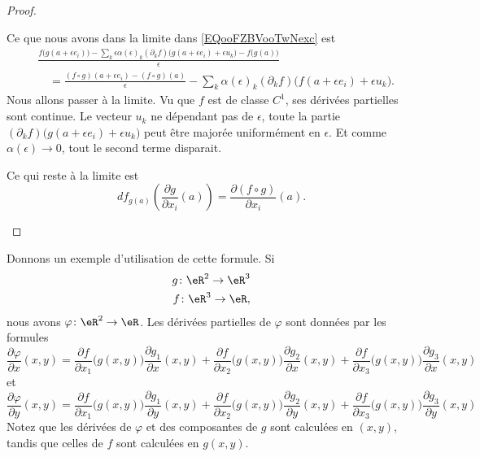 \begin{proof}
\begin{subproof}
\begin{equation}
		\end{equation}
		Ce que nous avons dans la limite dans \eqref{EQooFZBVooTwNexc} est
		\begin{subequations}
			\begin{align}
				 & \frac{ f\big( g(a+\epsilon e_i)\big)-\sum_k\epsilon\alpha(\epsilon)_k (\partial_kf)\big( g(a+\epsilon e_i)+\epsilon u_k \big)-f\big( g(a) \big) }{ \epsilon } \\
				 & \quad=\frac{ (f\circ g)(a+\epsilon e_i)-(f\circ g)(a) }{ \epsilon }
				-\sum_k\alpha(\epsilon)_k(\partial_kf)\big( f(a+\epsilon e_i)+\epsilon u_k \big).
			\end{align}
		\end{subequations}
		Nous allons passer à la limite. Vu que \( f\) est de classe \( C^1\), ses dérivées partielles sont continue. Le vecteur \( u_k\) ne dépendant pas de \( \epsilon\), toute la partie \( (\partial_kf)\big( g(a+\epsilon e_i)+\epsilon u_k \big)\) peut être majorée uniformément en \( \epsilon\). Et comme \( \alpha(\epsilon)\to 0\), tout le second terme disparait.

		Ce qui reste à la limite est
		\begin{equation}
			df_{g(a)}\left( \frac{ \partial g }{ \partial x_i }(a) \right)=\frac{ \partial (f\circ g) }{ \partial x_i }(a).
		\end{equation}
	\end{subproof}
\end{proof}

Donnons un exemple d'utilisation de cette formule. Si
\begin{equation}
	\begin{aligned}[]
		g\colon \eR^2\to \eR^3 \\
		f\colon \eR^3\to \eR,
	\end{aligned}
\end{equation}
nous avons \( \varphi\colon \eR^2\to \eR\). Les dérivées partielles de \( \varphi\) sont données par les formules
\begin{equation}
	\frac{ \partial \varphi }{ \partial x }(x,y)=
    \frac{ \partial f }{ \partial x_1 }\big( g(x,y) \big)\frac{ \partial g_1 }{ \partial x }(x,y)
    +\frac{ \partial f }{ \partial x_2 }\big( g(x,y) \big)\frac{ \partial g_2 }{ \partial x }(x,y)
    +\frac{ \partial f }{ \partial x_3 }\big( g(x,y) \big)\frac{ \partial g_3 }{ \partial x }(x,y)
\end{equation}
et
\begin{equation}
	\frac{ \partial \varphi }{ \partial y }(x,y)=\frac{ \partial f }{ \partial x_1 }\big( g(x,y) \big)\frac{ \partial g_1 }{ \partial y }(x,y)+\frac{ \partial f }{ \partial x_2 }\big( g(x,y) \big)\frac{ \partial g_2 }{ \partial y }(x,y)+\frac{ \partial f }{ \partial x_3 }\big( g(x,y) \big)\frac{ \partial g_3 }{ \partial y }(x,y)
\end{equation}
Notez que les dérivées de \( \varphi\) et des composantes de \( g\) sont calculées en \( (x,y)\), tandis que celles de \( f\) sont calculées en \( g(x,y)\).

